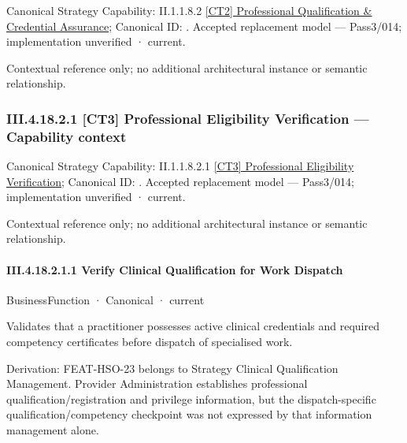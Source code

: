 {\small Canonical Strategy Capability: II.1.1.8.2 \hyperref[element:364a54333b644107ba9ae3ecc76ba186]{[CT2] Professional Qualification \& Credential Assurance}; Canonical ID: \texttt{}. Accepted replacement model — Pass3/014; implementation unverified · current.}\par
Contextual reference only; no additional architectural instance or semantic relationship.\par
\subsubsection*{III.4.18.2.1 [CT3] Professional Eligibility Verification — Capability context}
\label{navigation:III.4.18.2.1}

{\small Canonical Strategy Capability: II.1.1.8.2.1 \hyperref[element:3b43d350a52a4b608bc01eb2530a91be]{[CT3] Professional Eligibility Verification}; Canonical ID: \texttt{}. Accepted replacement model — Pass3/014; implementation unverified · current.}\par
Contextual reference only; no additional architectural instance or semantic relationship.\par
\paragraph*{III.4.18.2.1.1 Verify Clinical Qualification for Work Dispatch}
\label{navigation:III.4.18.2.1.1}

\label{element:1dfebc3aa5f949e5a20faa504eadbee1}
{\small BusinessFunction · Canonical · current}\par

Validates that a practitioner possesses active clinical credentials and required competency certificates before dispatch of specialised work.



Derivation: FEAT-HSO-23 belongs to Strategy Clinical Qualification Management. Provider Administration establishes professional qualification/registration and privilege information, but the dispatch-specific qualification/competency checkpoint was not expressed by that information management alone.


